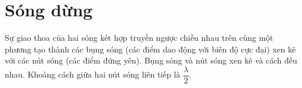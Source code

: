\section{Sóng dừng}
Sự giao thoa của hai sóng kết hợp truyền ngược chiều nhau trên cùng một phương tạo thành các bụng sóng (các điểm dao động với biên độ cực đại) xen kẽ với các nút sóng (các điểm đứng yên). Bụng sóng và nút sóng xen kẽ và cách đều nhau. Khoảng cách giữa hai nút sóng liên tiếp là $\dfrac{\lambda}{2}$.
